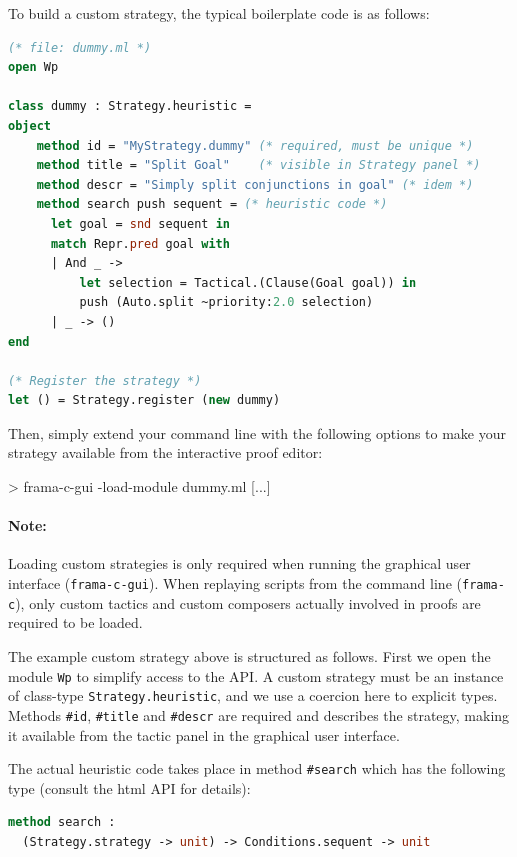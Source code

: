 To build a custom strategy, the typical boilerplate code is as follows:
\begin{lstlisting}[language=ocaml]
 (* file: dummy.ml *)
open Wp

class dummy : Strategy.heuristic =
object
    method id = "MyStrategy.dummy" (* required, must be unique *)
    method title = "Split Goal"    (* visible in Strategy panel *)
    method descr = "Simply split conjunctions in goal" (* idem *)
    method search push sequent = (* heuristic code *)
      let goal = snd sequent in
      match Repr.pred goal with
      | And _ ->
          let selection = Tactical.(Clause(Goal goal)) in
          push (Auto.split ~priority:2.0 selection)
      | _ -> ()
end

(* Register the strategy *)
let () = Strategy.register (new dummy)
\end{lstlisting}

Then, simply extend your command line with the following options to make your strategy available from the interactive proof editor:
\begin{logs}
> frama-c-gui -load-module dummy.ml [...]
\end{logs}

\paragraph{Note:} Loading custom strategies is only required when running the graphical user interface (\texttt{frama-c-gui}). When replaying scripts from the command line (\texttt{frama-c}), only custom tactics and custom composers actually involved in proofs are required to be loaded.

The example custom strategy above is structured as follows. First we open the module \lstinline$Wp$ to simplify
access to the API. A custom strategy must be an instance of class-type \lstinline$Strategy.heuristic$, and we use a coercion here to explicit types. Methods \lstinline$#id$, \lstinline$#title$ and \lstinline$#descr$ are required and describes the strategy, making it available from the tactic panel in the graphical user interface.

The actual heuristic code takes place in method \lstinline$#search$ which has the following type (consult the html API for details):
\begin{lstlisting}[language=ocaml]
method search :
  (Strategy.strategy -> unit) -> Conditions.sequent -> unit
\end{lstlisting}

